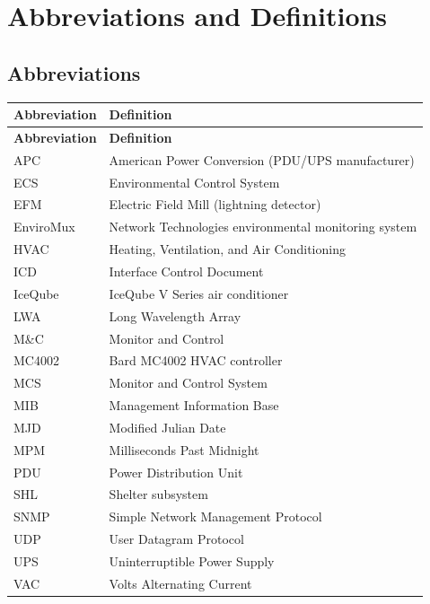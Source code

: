 
\chapter{Abbreviations and Definitions}
\label{sec:abbreviations}

\section{Abbreviations}

\begin{longtable}{p{3cm}p{11cm}}
    \toprule
    \textbf{Abbreviation} & \textbf{Definition} \\
    \midrule
    \endfirsthead
    \toprule
    \textbf{Abbreviation} & \textbf{Definition} \\
    \midrule
    \endhead
    \bottomrule
    \endfoot

    APC & American Power Conversion (PDU/UPS manufacturer) \\
    ECS & Environmental Control System \\
    EFM & Electric Field Mill (lightning detector) \\
    EnviroMux & Network Technologies environmental monitoring system \\
    HVAC & Heating, Ventilation, and Air Conditioning \\
    ICD & Interface Control Document \\
    IceQube & IceQube V Series air conditioner \\
    LWA & Long Wavelength Array \\
    M\&C & Monitor and Control \\
    MC4002 & Bard MC4002 HVAC controller \\
    MCS & Monitor and Control System \\
    MIB & Management Information Base \\
    MJD & Modified Julian Date \\
    MPM & Milliseconds Past Midnight \\
    PDU & Power Distribution Unit \\
    SHL & Shelter subsystem \\
    SNMP & Simple Network Management Protocol \\
    UDP & User Datagram Protocol \\
    UPS & Uninterruptible Power Supply \\
    VAC & Volts Alternating Current \\

\end{longtable}

